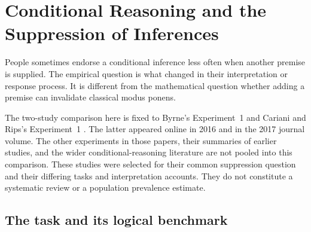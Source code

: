 \chapter{Conditional Reasoning and the Suppression of Inferences}
\label{sec:p19-conditional-reasoning-suppression}

People sometimes endorse a conditional inference less often when another
premise is supplied. The empirical question is what changed in their
interpretation or response process. It is different from the mathematical
question whether adding a premise can invalidate classical modus ponens.

The two-study comparison here is fixed to Byrne's Experiment~1
\cite[pp.~66--69, table~1 and appendix p.~80]{Byrne1989Suppression}
and Cariani and Rips's Experiment~1
\cite[Secs.~2.3, 5.1--5.2]{CarianiRips2017Suppression}.
The latter appeared online in 2016 and in the 2017 journal volume.
The other experiments in those papers, their summaries of earlier studies,
and the wider conditional-reasoning literature are not pooled into this
comparison. These studies were selected for their common suppression
question and their differing tasks and interpretation accounts. They do
not constitute a systematic review or a population prevalence estimate.

\section{The task and its logical benchmark}
\label{sec:p19-suppression-benchmark}

